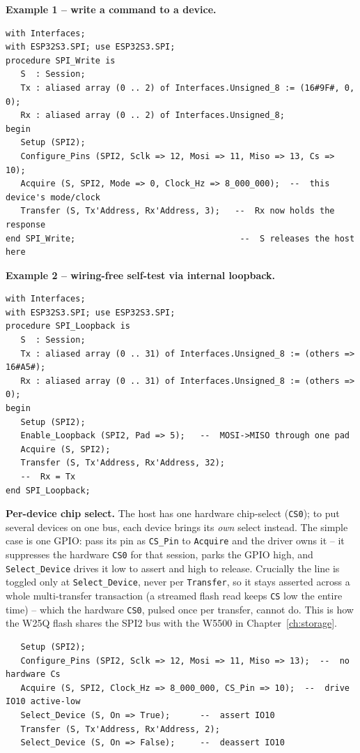 \textbf{Example 1 -- write a command to a device.}
\begin{lstlisting}
with Interfaces;
with ESP32S3.SPI; use ESP32S3.SPI;
procedure SPI_Write is
   S  : Session;
   Tx : aliased array (0 .. 2) of Interfaces.Unsigned_8 := (16#9F#, 0, 0);
   Rx : aliased array (0 .. 2) of Interfaces.Unsigned_8;
begin
   Setup (SPI2);
   Configure_Pins (SPI2, Sclk => 12, Mosi => 11, Miso => 13, Cs => 10);
   Acquire (S, SPI2, Mode => 0, Clock_Hz => 8_000_000);  --  this device's mode/clock
   Transfer (S, Tx'Address, Rx'Address, 3);   --  Rx now holds the response
end SPI_Write;                                 --  S releases the host here
\end{lstlisting}

\textbf{Example 2 -- wiring-free self-test via internal loopback.}
\begin{lstlisting}
with Interfaces;
with ESP32S3.SPI; use ESP32S3.SPI;
procedure SPI_Loopback is
   S  : Session;
   Tx : aliased array (0 .. 31) of Interfaces.Unsigned_8 := (others => 16#A5#);
   Rx : aliased array (0 .. 31) of Interfaces.Unsigned_8 := (others => 0);
begin
   Setup (SPI2);
   Enable_Loopback (SPI2, Pad => 5);   --  MOSI->MISO through one pad
   Acquire (S, SPI2);
   Transfer (S, Tx'Address, Rx'Address, 32);
   --  Rx = Tx
end SPI_Loopback;
\end{lstlisting}

\textbf{Per-device chip select.}
The host has one hardware chip-select (\texttt{CS0}); to put several devices on one
bus, each device brings its \emph{own} select instead. The simple case is one
GPIO: pass its pin as \texttt{CS\_Pin} to \texttt{Acquire} and the driver owns it
-- it suppresses the hardware \texttt{CS0} for that session, parks the GPIO high,
and \texttt{Select\_Device} drives it low to assert and high to release. Crucially
the line is toggled only at \texttt{Select\_Device}, never per \texttt{Transfer}, so
it stays asserted across a whole multi-transfer transaction (a streamed flash read
keeps \texttt{CS} low the entire time) -- which the hardware \texttt{CS0}, pulsed
once per transfer, cannot do. This is how the W25Q flash shares the SPI2 bus with
the W5500 in Chapter~\ref{ch:storage}.

\begin{lstlisting}
   Setup (SPI2);
   Configure_Pins (SPI2, Sclk => 12, Mosi => 11, Miso => 13);  --  no hardware Cs
   Acquire (S, SPI2, Clock_Hz => 8_000_000, CS_Pin => 10);  --  drive IO10 active-low
   Select_Device (S, On => True);      --  assert IO10
   Transfer (S, Tx'Address, Rx'Address, 2);
   Select_Device (S, On => False);     --  deassert IO10
\end{lstlisting}

